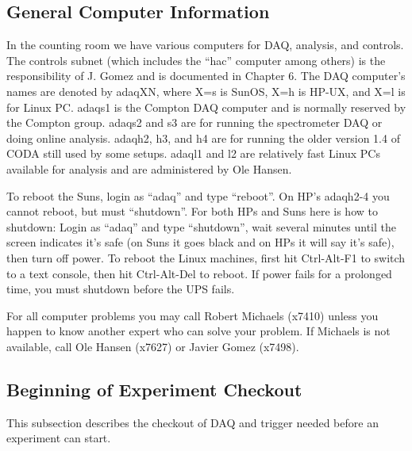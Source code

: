 \subsection{General Computer Information}

\par
In the counting room we have various computers 
for DAQ, analysis, and controls.  The controls
subnet (which includes the ``hac'' computer 
among others) is the 
responsibility of J. Gomez and is documented in Chapter 6.
The DAQ computer's names are denoted by adaqXN, where
X=s is SunOS, X=h is HP-UX, and X=l is for Linux PC. 
adaqs1 is the Compton DAQ computer and is normally
reserved by the Compton group.  adaqs2 and s3
are for running the spectrometer DAQ or doing
online analysis.  adaqh2, h3, and h4 are for
running the older version 1.4 of CODA still
used by some setups.  adaql1 and l2 are relatively
fast Linux PCs available for analysis and are 
administered by Ole Hansen.  

\par
To reboot the Suns,  login as ``adaq''
and type ``reboot''.  On HP's adaqh2-4 you cannot
reboot, but must ``shutdown''.  For both HPs and Suns
here is how to shutdown:  Login as ``adaq'' and 
type ``shutdown'', wait several minutes until the 
screen indicates it's safe (on Suns it goes black and
on HPs it will say it's safe), then turn off power.
To reboot the Linux machines, first hit Ctrl-Alt-F1
to switch to a text console, then hit Ctrl-Alt-Del 
to reboot.
If power fails for a prolonged time,
you must shutdown before the UPS fails.

\par
For all computer problems you may
call Robert Michaels (x7410)
unless you happen to know another expert who can solve your problem.
If Michaels is not available, call Ole Hansen  (x7627) or
Javier Gomez (x7498).  


\subsection{Beginning of Experiment Checkout}

\par
This subsection describes the 
checkout of DAQ and trigger
needed before an experiment can start.

